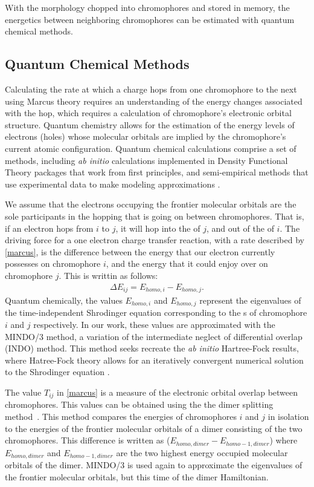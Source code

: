 With the morphology chopped into chromophores and stored in memory, the energetics between
neighboring chromophores can be estimated with quantum chemical methods.

\subsection{Quantum Chemical Methods}
\label{qccmethods}

Calculating the rate at which a charge hops from one chromophore to the next
using Marcus theory requires an understanding of the energy changes associated with the hop, 
which requires a calculation of chromophore's electronic orbital structure.
Quantum chemistry allows for the estimation of the energy levels of electrons (holes) whose molecular orbitals 
are implied by the chromophore's current atomic configuration. 
Quantum chemical calculations comprise a set of methods, including \textit{ab initio} calculations implemented 
in Density Functional Theory packages that work from first principles, 
and semi-empirical methods that use experimental data to make modeling approximations \cite{Cui2014a}.

We assume that the electrons occupying the frontier molecular orbitals are the sole participants in the
hopping that is going on between chromophores. That is, if an electron hops from $i$ to $j$, it will hop
into the  of $j$, and out of the
 of $i$.
The driving force for a one electron charge transfer reaction, 
with a rate described by \autoref{marcus}, is the difference between the energy that our electron 
currently possesses
on chromophore $i$, and the energy that it could enjoy over on chromophore $j$. 
This is writtin as follows:
\begin{align}
    \Delta E_{ij} = E_{homo, i} - E_{homo, j}.
    \label{gibbs}
\end{align}
Quantum chemically, the values $E_{homo, i}$ and $E_{homo, j}$ represent the eigenvalues of the
time-independent Shrodinger equation corresponding to the s of chromophore $i$ and $j$ respectively. 
In our work, these values are approximated with the MINDO/3 method, a variation of the intermediate neglect of 
differential overlap (INDO) method. This method seeks recreate the \textit{ab initio} Hartree-Fock
results, where Hatree-Fock theory allows for an iteratively convergent numerical solution to the
Shrodinger equation \cite{Thiel2014}. 

The value $T_{ij}$ in \autoref{marcus} is a measure of the electronic orbital overlap between chromophores.
This values can be obtained using the
the dimer splitting method~\cite{Huang2005b}. This method compares the  energies of chromophores $i$ and
$j$ in isolation to the energies of the frontier molecular orbitals of a dimer
consisting of the two chromophores. 
This difference is written as ($E_{homo,dimer} - E_{homo-1,dimer}$) where $E_{homo,dimer}$ 
and $E_{homo-1,dimer}$ are the two highest energy occupied molecular orbitals of the dimer. MINDO/3 is used
again to approximate the eigenvalues of the frontier molecular orbitals, but this time of the dimer
Hamiltonian. 

